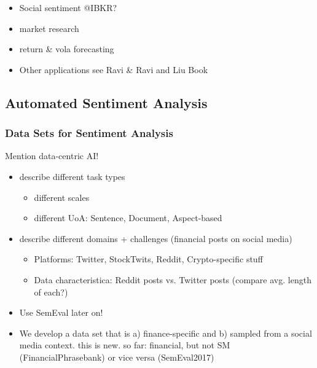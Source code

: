\begin{itemize}
	\item Social sentiment @IBKR?
\end{itemize}


\begin{itemize}[noitemsep]
	\item market research
	\item return \& vola forecasting
	\item Other applications see Ravi \& Ravi and Liu Book
\end{itemize}

\subsection{Automated Sentiment Analysis}


\subsubsection{Data Sets for Sentiment Analysis}
Mention data-centric AI!
\begin{itemize}[noitemsep]
	\item describe different task types
	\begin{itemize}
		\item different scales
		\item different UoA: Sentence, Document, Aspect-based
	\end{itemize}
	\item describe different domains + challenges (financial posts on social media)
	\begin{itemize}[noitemsep]
		\item Platforms: Twitter, StockTwits, Reddit, Crypto-specific stuff
		\item Data characteristica: Reddit posts vs. Twitter posts (compare avg. length of each?)
\end{itemize}
	\item Use SemEval later on!
	\item We develop a data set that is a) finance-specific and b) sampled from a social media context. this is new. so far: financial, but not SM (FinancialPhrasebank) or vice versa (SemEval2017)
\end{itemize}

